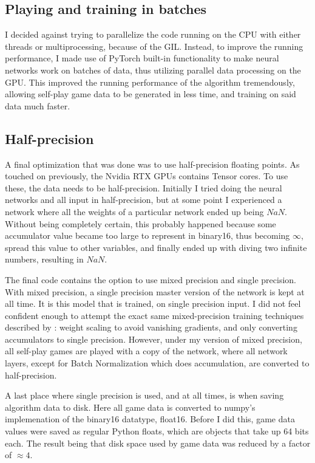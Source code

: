 \subsection{Playing and training in batches}
I decided against trying to parallelize the code running on the CPU with either threads or multiprocessing, because of the GIL. Instead, to improve the running performance, I made use of PyTorch built-in functionality to make neural networks work on batches of data, thus utilizing parallel data processing on the GPU. This improved the running performance of the algorithm tremendously, allowing self-play game data to be generated in less time, and training on said data much faster.

\subsection{Half-precision}
A final optimization that was done was to use half-precision floating points. As touched on previously, the Nvidia RTX GPUs contains Tensor cores. To use these, the data needs to be half-precision. Initially I tried doing the neural networks and all input in half-precision, but at some point I experienced a network where all the weights of a particular network ended up being $\textit{NaN}$. Without being completely certain, this probably happened because some accumulator value became too large to represent in binary16, thus becoming $\infty$, spread this value to other variables, and finally ended up with diving two infinite numbers, resulting in $\textit{NaN}$.

The final code contains the option to use mixed precision and single precision. With mixed precision, a single precision master version of the network is kept at all time. It is this model that is trained, on single precision input. I did not feel confident enough to attempt the exact same mixed-precision training techniques described by \citeauthor{Micikevicius2018}: weight scaling to avoid vanishing gradients, and only converting accumulators to single precision\cite{Micikevicius2018}. However, under my version of mixed precision, all self-play games are played with a copy of the network, where all network layers, except for Batch Normalization which does accumulation, are converted to half-precision.

A last place where single precision is used, and at all times, is when saving algorithm data to disk. Here all game data is converted to numpy's implemenation of the binary16 datatype, float16. Before I did this, game data values were saved as regular Python floats, which are objects that take up 64 bits each. The result being that disk space used by game data was reduced by a factor of $\approx 4$.


